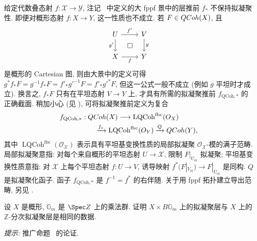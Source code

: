 \begin{remark}\label{src:7.1.9}
给定代数叠态射 $f:\mathcal X\to\mathcal Y$, 注记~ 中定义的大 fppf 景中的层推前 $f_*$ 不保持拟凝聚性. 即便对概形态射 $f:X\to Y$, 这一性质也不成立. 若 $F\in QCoh(X)$, 且
\[
\begin{tikzcd}[ampersand replacement=\&]
U\arrow[r,"{f'}"]\arrow[d,"{g'}"']\&V\arrow[d,"{g}"]\\
X\arrow[r,"{f}"']\arrow[ur,phantom,"{\square}"]\&Y
\end{tikzcd}
\]
是概形的 Cartesian 图, 则由大景中的定义可得 $g^*f_*F=g^{-1}f_*F=f'_*g'^{-1}F=f'_*g'^*F$, 但这一公式一般不成立 (例如 $g$ 平坦时才成立). 换言之, $f_*F$ 只有在平坦态射 $V\to Y$ 上, 才具有所需的拟凝聚推前 $f_{\mathrm{QCoh},*}$ 的正确截面. 稍加小心 (见 \cite[Tag 070A]{SP}), 可将拟凝聚推前定义为复合
\[
\begin{aligned}
&f_{\mathrm{QCoh},*}:QCoh(X)\longrightarrow\operatorname{LQCoh}^{\mathrm{fbc}}(O_{X})\\
&\hspace{5em}\xrightarrow{f_*}\operatorname{LQCoh}^{\mathrm{fbc}}(O_{Y})\xrightarrow{Q}QCoh(Y),
\end{aligned}
\]
其中 $\operatorname{LQCoh}^{\mathrm{fbc}}(\mathcal O_{\mathcal X})$ 表示具有平坦基变换性质的局部拟凝聚 $\mathcal O_{\mathcal X}$-模的满子范畴. 局部拟凝聚意指: 对每个来自概形的平坦态射 $U\to\mathcal X$, 限制 $F|_{U_{\text{ét}}}$ 拟凝聚; 平坦基变换性质意指: 对 $\mathcal X$ 上每个平坦态射 $f:U\to V$, 诱导映射 $f^*(F|_{V_{\text{ét}}})\to F|_{U_{\text{ét}}}$ 是同构. $Q$ 是拟凝聚化函子. 函子 $f_{\mathrm{QCoh},*}$ 是 $f^{-1}=f^*$ 的右伴随. 关于用 fppf 拓扑建立导出范畴, 另见 \cite[Tag 08MW]{SP}.
\end{remark}
\begin{exercise}\label{src:7.1.10}
设 $X$ 是概形, $\mathbb G_m$ 是 $\Spec\mathbb Z$ 上的乘法群. 证明 $X\times B\mathbb G_m$ 上的拟凝聚层与 $X$ 上的 $\mathbb Z$-分次拟凝聚层是相同的数据.

\textit{提示:} 推广命题~ 的论证.
\end{exercise}
